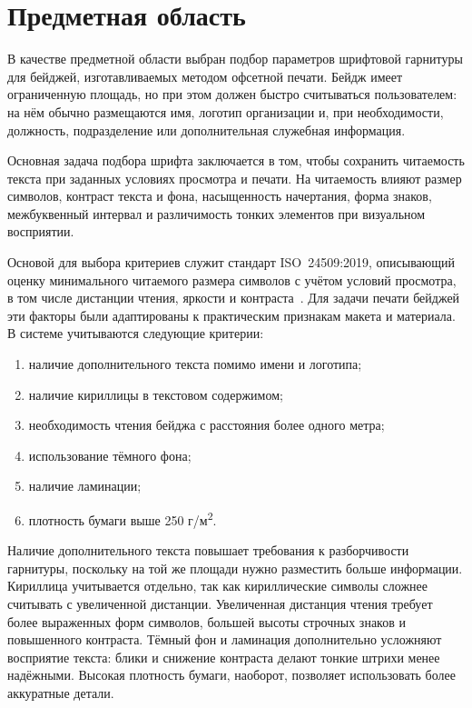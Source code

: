\section{Предметная область}

В качестве предметной области выбран подбор параметров шрифтовой гарнитуры для бейджей, изготавливаемых методом офсетной печати. Бейдж имеет ограниченную площадь, но при этом должен быстро считываться пользователем: на нём обычно размещаются имя, логотип организации и, при необходимости, должность, подразделение или дополнительная служебная информация.

Основная задача подбора шрифта заключается в том, чтобы сохранить читаемость текста при заданных условиях просмотра и печати. На читаемость влияют размер символов, контраст текста и фона, насыщенность начертания, форма знаков, межбуквенный интервал и различимость тонких элементов при визуальном восприятии.

Основой для выбора критериев служит стандарт ISO~24509:2019, описывающий оценку минимального читаемого размера символов с учётом условий просмотра, в том числе дистанции чтения, яркости и контраста~\cite{iso24509}. Для задачи печати бейджей эти факторы были адаптированы к практическим признакам макета и материала. В системе учитываются следующие критерии:

\begin{enumerate}
    \item наличие дополнительного текста помимо имени и логотипа;
    \item наличие кириллицы в текстовом содержимом;
    \item необходимость чтения бейджа с расстояния более одного метра;
    \item использование тёмного фона;
    \item наличие ламинации;
    \item плотность бумаги выше 250 г/м\textsuperscript{2}.
\end{enumerate}

Наличие дополнительного текста повышает требования к разборчивости гарнитуры, поскольку на той же площади нужно разместить больше информации. Кириллица учитывается отдельно, так как кириллические символы сложнее считывать с увеличенной дистанции. Увеличенная дистанция чтения требует более выраженных форм символов, большей высоты строчных знаков и повышенного контраста. Тёмный фон и ламинация дополнительно усложняют восприятие текста: блики и снижение контраста делают тонкие штрихи менее надёжными. Высокая плотность бумаги, наоборот, позволяет использовать более аккуратные детали.

